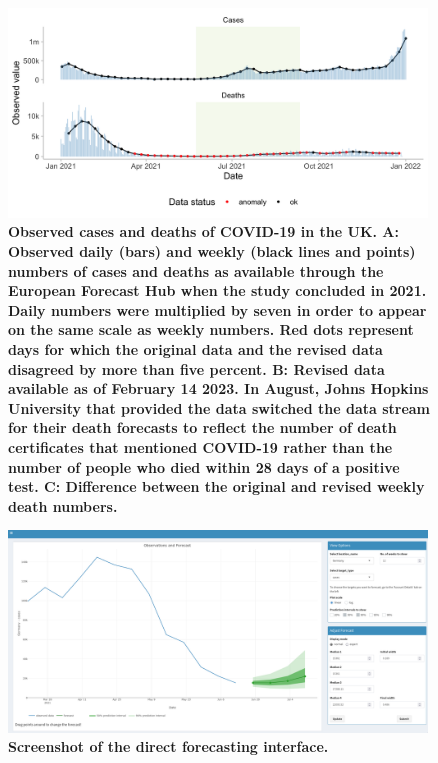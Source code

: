 \documentclass[10pt,a4paper,twocolumn]{article}
\begin{document}
\begin{figure}
\centering
\includegraphics[width=0.99\textwidth]{../output/figures/plot-data.png}
\caption{\bf{Observed cases and deaths of COVID-19 in the UK}. A: Observed daily (bars) and weekly (black lines and points) numbers of cases and deaths as available through the European Forecast Hub when the study concluded in 2021. Daily numbers were multiplied by seven in order to appear on the same scale as weekly numbers. Red dots represent days for which the original data and the revised data disagreed by more than five percent. B: Revised data available as of February 14 2023. In August, Johns Hopkins University that provided the data switched the data stream for their death forecasts to reflect the number of death certificates that mentioned COVID-19 rather than the number of people who died within 28 days of a positive test. C: Difference between the original and revised weekly death numbers.}
\label{fig:plot-data}
\end{figure}


\begin{figure}
\centering
\includegraphics[width=0.99\textwidth]{../output/figures/screenshot-crowd-classical.png}
\caption{\bf{Screenshot of the direct forecasting interface.}}
\label{fig:screenshot-classical}
\end{figure}
\end{document}
